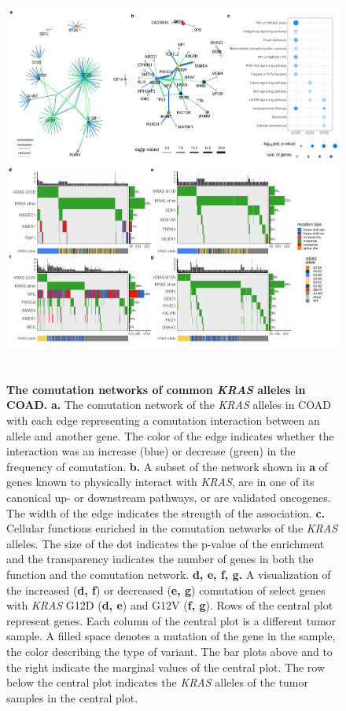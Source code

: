 \documentclass[english, 10pt, letterpaper]{article}
\newcommand{\KRAS}{\emph{KRAS}}
\begin{document}
\begin{figure}[p]
\centering
\includegraphics[height=135mm]{figures/Figure_02.jpeg}
\caption{
    \textbf{The comutation networks of common \KRAS{} alleles in COAD.}
    \textbf{a.} The comutation network of the \KRAS{} alleles in COAD with each edge representing a comutation interaction between an allele and another gene. The color of the edge indicates whether the interaction was an increase (blue) or decrease (green) in the frequency of comutation.
    \textbf{b.} A subset of the network shown in \textbf{a} of genes known to physically interact with \KRAS{}, are in one of its canonical up- or downstream pathways, or are validated oncogenes. The width of the edge indicates the strength of the association.
    \textbf{c.} Cellular functions enriched in the comutation networks of the \KRAS{} alleles. The size of the dot indicates the p-value of the enrichment and the transparency indicates the number of genes in both the function and the comutation network.
    \textbf{d, e, f, g.} A visualization of the increased (\textbf{d, f}) or decreased (\textbf{e, g}) comutation of select genes with \KRAS{} G12D (\textbf{d, e}) and G12V (\textbf{f, g}). Rows of the central plot represent genes. Each column of the central plot is a different tumor sample. A filled space denotes a mutation of the gene in the sample, the color describing the type of variant. The bar plots above and to the right indicate the marginal values of the central plot. The row below the central plot indicates the \KRAS{} alleles of the tumor samples in the central plot.
}
\label{fig:coad-comutation-main}
\end{figure}
\end{document}
